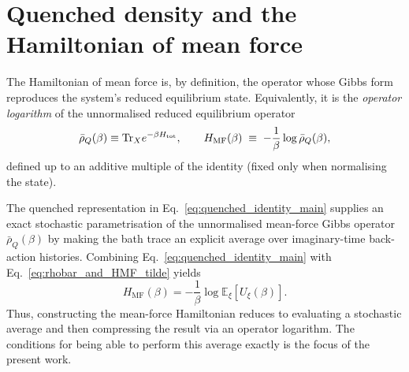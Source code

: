 ﻿%
\section{Quenched density and the Hamiltonian of mean force \label{sec:hmf}}
The Hamiltonian of mean force is, by definition, the operator whose Gibbs form reproduces the
system's reduced equilibrium state. Equivalently, it is the \emph{operator logarithm} of the
unnormalised reduced equilibrium operator
\begin{equation}
\bar{\rho}_Q(\beta)\equiv \mathrm{Tr}_X e^{-\beta H_{\mathrm{tot}}},
\qquad
H_{\mathrm{MF}}(\beta)\;\equiv\;-\frac{1}{\beta}\log \bar{\rho}_Q(\beta),
\label{eq:rhobar_and_HMF_tilde}
\end{equation}
defined up to an additive multiple of the identity (fixed only when normalising the state).

The quenched representation in Eq.~\eqref{eq:quenched_identity_main} supplies an exact stochastic
parametrisation of the unnormalised mean-force Gibbs operator $\bar{\rho}_Q(\beta)$ by making the
bath trace an explicit average over imaginary-time back-action histories. Combining
Eq.~\eqref{eq:quenched_identity_main} with Eq.~\eqref{eq:rhobar_and_HMF_tilde} yields
\begin{equation}
H_{\mathrm{MF}}(\beta)
=
-\frac{1}{\beta}\log \mathbb E_\xi\!\left[U_\xi(\beta)\right].
\end{equation}
Thus, constructing the mean-force Hamiltonian reduces to evaluating a stochastic average and then
compressing the result via an operator logarithm. The conditions for being able to perform this average exactly is the focus of the present work. 

